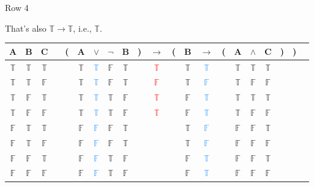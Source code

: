 \documentclass[
  ignorenonframetext,
]{beamer}
\renewcommand{\,}{\text{, }}
\def\True{\mathbb{T}}
\def\False{\mathbb{F}}
\begin{document}
\begin{frame}{Row 4}
\protect\hypertarget{row-4-1}{}

That's also \(\True \rightarrow \True\), i.e., \(\True\).

\begin{center}
\bigskip
\begin{tabular}{@{ }c@{ }@{ }c@{ }@{ }c | c@{ }@{}c@{}@{ }c@{ }@{ }c@{ }@{ }c@{ }@{ }c@{ }@{}c@{}@{ }c@{ }@{}c@{}@{ }c@{ }@{ }c@{ }@{}c@{}@{ }c@{ }@{ }c@{ }@{ }c@{ }@{}c@{}@{}c@{}@{ }c}
A & B & C &  & ( & A & $\vee$ & $\neg$ & B & ) & $\rightarrow$ & ( & B & $\rightarrow$ & ( & A & $\wedge$ & C & ) & ) & \\
\hline 
 $\True$ & $\True$ & $\True$ &  &  & $\True$ & \textcolor{dodgerblue}{$\True$} & $\False$ & $\True$ &  &\textcolor{red}{$\True$}&  & $\True$ & \textcolor{dodgerblue}{$\True$} &  & $\True$ & $\True$ & $\True$ &  &  & \\
 $\True$ & $\True$ & $\False$ &  &  & $\True$ & \textcolor{dodgerblue}{$\True$} & $\False$ & $\True$ &  &\textcolor{red}{$\False$}&  & $\True$ & \textcolor{dodgerblue}{$\False$} &  & $\True$ & $\False$ & $\False$ &  &  & \\
 $\True$ & $\False$ & $\True$ &  &  & $\True$ & \textcolor{dodgerblue}{$\True$} & $\True$ & $\False$ &  &\textcolor{red}{$\True$}&  & $\False$ & \textcolor{dodgerblue}{$\True$} &  & $\True$ & $\True$ & $\True$ &  &  & \\
 $\True$ & $\False$ & $\False$ &  &  & $\True$ & \textcolor{dodgerblue}{$\True$} & $\True$ & $\False$ &  &\textcolor{red}{$\True$}&  & $\False$ & \textcolor{dodgerblue}{$\True$} &  & $\True$ & $\False$ & $\False$ &  &  & \\
 $\False$ & $\True$ & $\True$ &  &  & $\False$ & \textcolor{dodgerblue}{$\False$} & $\False$ & $\True$ &  &&  & $\True$ & \textcolor{dodgerblue}{$\False$} &  & $\False$ & $\False$ & $\True$ &  &  & \\
 $\False$ & $\True$ & $\False$ &  &  & $\False$ & \textcolor{dodgerblue}{$\False$} & $\False$ & $\True$ &  &&  & $\True$ & \textcolor{dodgerblue}{$\False$} &  & $\False$ & $\False$ & $\False$ &  &  & \\
 $\False$ & $\False$ & $\True$ &  &  & $\False$ & \textcolor{dodgerblue}{$\False$} & $\True$ & $\False$ &  &&  & $\False$ & \textcolor{dodgerblue}{$\True$} &  & $\False$ & $\False$ & $\True$ &  &  & \\
 $\False$ & $\False$ & $\False$ &  &  & $\False$ & \textcolor{dodgerblue}{$\False$} & $\True$ & $\False$ &  &&  & $\False$ & \textcolor{dodgerblue}{$\True$} &  & $\False$ & $\False$ & $\False$ &  &  & \\
\end{tabular}
\bigskip
\end{center}

\end{frame}
\end{document}

